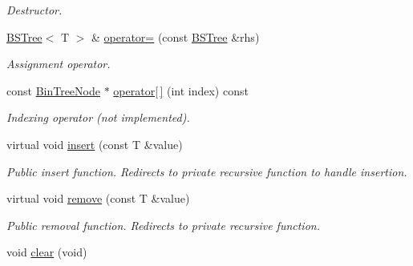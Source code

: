 \begin{DoxyCompactItemize}
\begin{DoxyCompactList}\small\item\em Destructor. \end{DoxyCompactList}\item 
\hyperlink{classBSTree}{B\-S\-Tree}$<$ T $>$ \& \hyperlink{classBSTree_a7f20b5a0e6a3114b402085b00b7878ab}{operator=} (const \hyperlink{classBSTree}{B\-S\-Tree} \&rhs)
\begin{DoxyCompactList}\small\item\em Assignment operator. \end{DoxyCompactList}\item 
const \hyperlink{structBSTree_1_1BinTreeNode}{Bin\-Tree\-Node} $\ast$ \hyperlink{classBSTree_ad0369e593a64399537242a6ee3656a69}{operator\mbox{[}$\,$\mbox{]}} (int index) const 
\begin{DoxyCompactList}\small\item\em Indexing operator (not implemented). \end{DoxyCompactList}\item 
virtual void \hyperlink{classBSTree_aa7fc7600f30d0ecc0a75b25e11f6cc57}{insert} (const T \&value)
\begin{DoxyCompactList}\small\item\em Public insert function. Redirects to private recursive function to handle insertion. \end{DoxyCompactList}\item 
virtual void \hyperlink{classBSTree_a6b930b09010b674ca6b09c88bd3effeb}{remove} (const T \&value)
\begin{DoxyCompactList}\small\item\em Public removal function. Redirects to private recursive function. \end{DoxyCompactList}\item 
\hypertarget{classBSTree_ab4ec7dcce20e9bf8a3e09b371d3af73d}{void \hyperlink{classBSTree_ab4ec7dcce20e9bf8a3e09b371d3af73d}{clear} (void)}\label{classBSTree_ab4ec7dcce20e9bf8a3e09b371d3af73d}


\end{DoxyCompactItemize}

